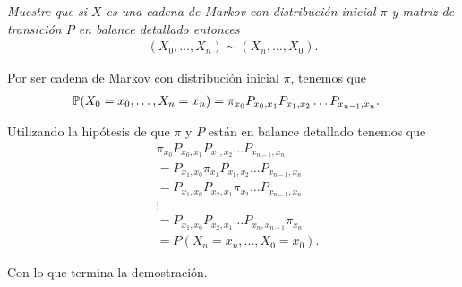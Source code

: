 \emph{
    Muestre que si $X$ es una cadena de Markov con distribución inicial $\pi$ y matriz de transición $P$ en balance detallado entonces
    \begin{align}
            (X_0, \dots, X_n) \sim (X_n, \dots, X_0).
    \end{align}
}

\afterstatement\pn

Por ser cadena de Markov con distribución inicial $\pi$, tenemos que
\begin{align}
        \P(X_0 = x_0, \dots, X_n = x_n) &=  \pi_{x_0} P_{x_0, x_1} P_{x_1, x_2} \dots P_{x_{n-1}, x_{n}}.
\end{align}\pn

Utilizando la hipótesis de que $\pi$ y $P$ están en balance detallado tenemos que
\begin{align}
    &   \pi_{x_0} P_{x_0, x_1} P_{x_1, x_2} \dots P_{x_{n-1}, x_{n}}    \\
    &=  P_{x_1, x_0} \pi_{x_1} P_{x_1, x_2} \dots P_{x_{n-1}, x_{n}}    \\
    &=  P_{x_1, x_0} P_{x_2, x_1} \pi_{x_2} \dots P_{x_{n-1}, x_{n}}    \\
    &\vdots                                                             \\
    &=  P_{x_1, x_0} P_{x_2, x_1} \dots P_{x_{n}, x_{n-1}} \pi_{x_n}    \\
    &= P(X_n = x_n, \dots, X_0 = x_0).
\end{align}

Con lo que termina la demostración.